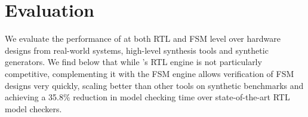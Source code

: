 \documentclass[acmsmall,screen,review]{acmart}
\begin{document}


\section{Evaluation}
\label{sec:eval}


We evaluate the performance of \toolname{} at both RTL and FSM level over hardware designs from real-world systems, high-level synthesis tools and synthetic generators.
We find below that while \toolname{}'s RTL engine is not particularly competitive, complementing it with the FSM engine allows verification of FSM designs very quickly, scaling better than other tools on synthetic benchmarks and achieving a 35.8\% reduction in model checking time over state-of-the-art RTL model checkers.
\end{document}
